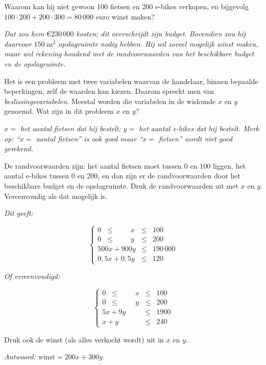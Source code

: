     \begin{werktekstoef}
    

	\item Waarom kan hij niet gewoon 100 fietsen en 200 e-bikes verkopen, en bijgevolg $100\cdot 200 + 200\cdot 300 = 80\,000$ euro winst maken?
	
	\emph{Dat zou hem $\euro 230\,000$ kosten; dit overschrijdt zijn budget. Bovendien zou hij daarvoor $150\; \mathrm{m}^2$ opslagruimte nodig hebben. Hij wil zoveel mogelijk winst maken, maar wel rekening houdend met de randvoorwaarden van het beschikbare budget en de opslagruimte.}
	
	\item Het is een probleem met twee variabelen waarvan de handelaar, binnen bepaalde beperkingen, zelf de waarden kan kiezen. Daarom spreekt men van \emph{beslissingsvariabelen}. Meestal worden die variabelen in de wiskunde $x$ en $y$ genoemd. Wat zijn in dit probleem $x$ en $y$?
	
	\emph{$x =$ het aantal fietsen dat hij bestelt; $y=$ het aantal e-bikes dat hij bestelt. Merk op: ``$x=$ aantal fietsen'' is ook goed maar ``$x=$ fietsen'' wordt niet goed gerekend.}
	
	\item De randvoorwaarden zijn: het aantal fietsen moet tussen 0 en 100 liggen, het aantal e-bikes tussen 0 en 200, en dan zijn er de randvoorwaarden door het beschikbare budget en de opslagruimte. Druk de randvoorwaarden uit met $x$ en $y$. Vereenvoudig als dat mogelijk is.
	
	\emph{Dit geeft:}
	
	$$
	\left\{
	\begin{array}{ccr}
		
		0\;\; \le \;\;\;\;\;\;\;\; x &\le &100 \\
		0\;\;\le \;\;\;\;\;\;\;\; y &\le &200 \\
		500x+900y &\le  &190\,000 \\
		0,5x+0,5y &\le  &120
		
	\end{array}
	\right.
	$$
	
	\emph{Of vereenvoudigd:}
	
    $$
    \left\{
    \begin{array}{ccr}
    	
    	0\;\; \le \;\;\;\;\;\;\;\; x &\le &100 \\
    	0\;\;\le \;\;\;\;\;\;\;\; y &\le &200 \\
    	5x+9y &\le  &1900 \\
    	x+y &\le  &240
    	
    \end{array}
    \right.
    $$  

    \item Druk ook de winst (als alles verkocht wordt) uit in $x$ en $y$. 
    
    \emph{Antwoord: $\mathrm{winst} = 200 x+ 300 y$.}
    
    \end{werktekstoef}
    
